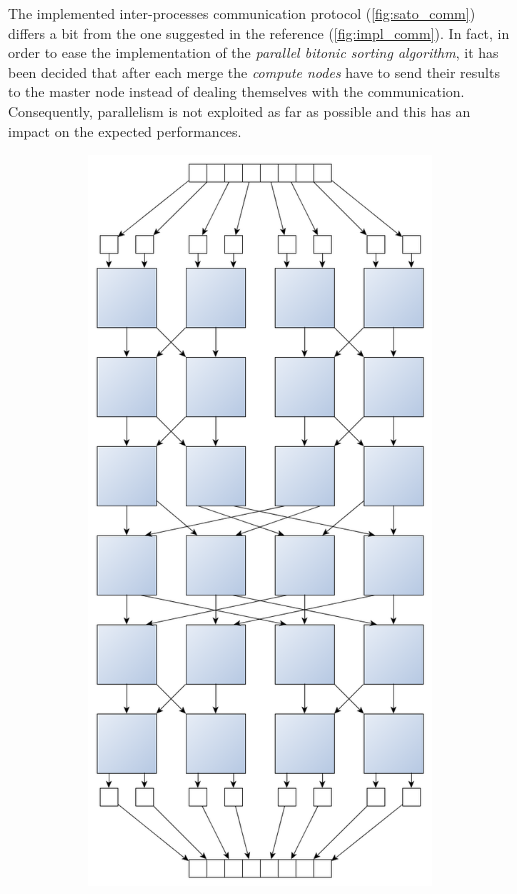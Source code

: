 \documentclass[a4paper,11pt]{article}
\begin{document}
  The implemented inter-processes communication protocol (\ref{fig:sato_comm}) differs a bit from the one suggested in the reference (\ref{fig:impl_comm}). In fact, in order to ease the implementation of the \textit{parallel bitonic sorting algorithm}, it has been decided that after each merge the \textit{compute nodes} have to send their results to the master node instead of dealing themselves with the communication. Consequently, parallelism is not exploited as far as possible and this has an impact on the expected performances.
  \begin{figure}[h!]
    \centering
    \begin{subfigure}[b]{0.4\textwidth}
        \centering
        \includegraphics[scale=0.15]{img/bitonic_sort_8_sota.png}

\end{subfigure}
\end{figure}
\end{document}
